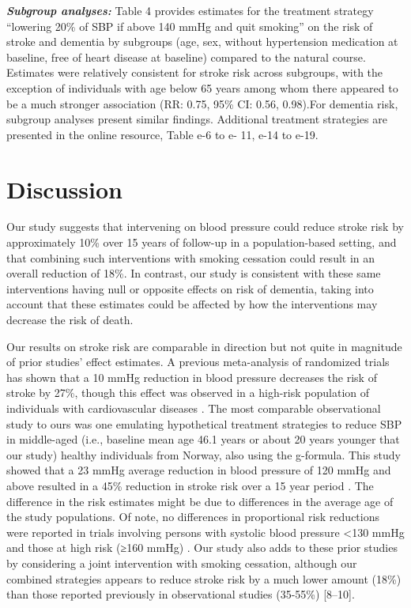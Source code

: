 \documentclass[
]{book}
\begin{document}
\textbf{\emph{Subgroup analyses:}} Table 4 provides estimates for the treatment strategy ``lowering 20\% of SBP if above 140 mmHg and quit smoking'' on the risk of stroke and dementia by subgroups (age, sex, without hypertension medication at baseline, free of heart disease at baseline) compared to the natural course. Estimates were relatively consistent for stroke risk across subgroups, with the exception of individuals with age below 65 years among whom there appeared to be a much stronger association (RR: 0.75, 95\% CI: 0.56, 0.98).For dementia risk, subgroup analyses present similar findings. Additional treatment strategies are presented in the online resource, Table e-6 to e- 11, e-14 to e-19.

\hypertarget{discussion}{%
\section{Discussion}\label{discussion}}

Our study suggests that intervening on blood pressure could reduce stroke risk by approximately 10\% over 15 years of follow-up in a population-based setting, and that combining such interventions with smoking cessation could result in an overall reduction of 18\%. In contrast, our study is consistent with these same interventions having null or opposite effects on risk of dementia, taking into account that these estimates could be affected by how the interventions may decrease the risk of death.

Our results on stroke risk are comparable in direction but not quite in magnitude of prior studies' effect estimates. A previous meta-analysis of randomized trials has shown that a 10 mmHg reduction in blood pressure decreases the risk of stroke by 27\%, though this effect was observed in a high-risk population of individuals with cardiovascular diseases \autocite{ettehad2016}. The most comparable observational study to ours was one emulating hypothetical treatment strategies to reduce SBP in middle-aged (i.e., baseline mean age 46.1 years or about 20 years younger that our study) healthy individuals from Norway, also using the g-formula. This study showed that a 23 mmHg average reduction in blood pressure of 120 mmHg and above resulted in a 45\% reduction in stroke risk over a 15 year period \autocite{vangenlonne2018}. The difference in the risk estimates might be due to differences in the average age of the study populations. Of note, no differences in proportional risk reductions were reported in trials involving persons with systolic blood pressure \textless130 mmHg and those at high risk (≥160 mmHg) \autocite{ettehad2016}. Our study also adds to these prior studies by considering a joint intervention with smoking cessation, although our combined strategies appears to reduce stroke risk by a much lower amount (18\%) than those reported previously in observational studies (35-55\%) {[}8--10{]}.
\end{document}
